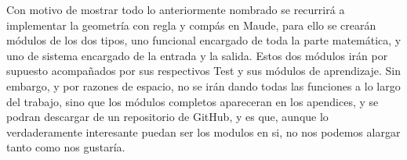 Con motivo de mostrar todo lo anteriormente nombrado se recurrirá a implementar la geometría con regla y compás en Maude, para ello se crearán módulos de los dos tipos, uno funcional encargado de toda la parte matemática, y uno de sistema encargado de la entrada y la salida. Estos dos módulos irán por supuesto acompañados por sus respectivos Test y sus módulos de aprendizaje. Sin embargo, y por razones de espacio, no se irán dando todas las funciones a lo largo del trabajo, sino que los módulos completos apareceran en los apendices, y se podran descargar de un repositorio de GitHub, y es que, aunque lo verdaderamente interesante puedan ser los modulos en si, no nos podemos alargar tanto como nos gustaría.\par

